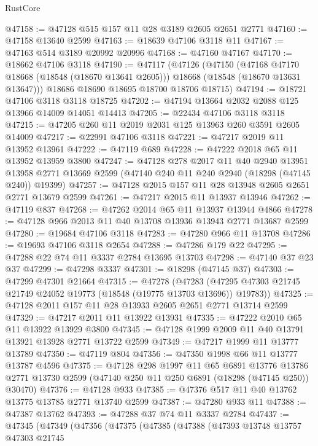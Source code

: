 \begin{lexlean}{RustCore}
\begin{coremodule}
@47158 := @47128 @515 @157 @11 @28 @3189 @2605 @2651 @2771
@47160 := @47158 @13640 @2599
@47163 := @18639 @47106 @3118 @11
@47167 := @47163 @514 @3189 @20992 @20996
@47168 := @47160 @47167
@47170 := @18662 @47106 @3118
@47190 := @47117
    (@47126
      (@47150
        (@47168 @47170 @18668 (@18548 (@18670 @13641 @2605)))
        @18668
        (@18548 (@18670 @13631 @13647)))
      @18686
      @18690
      @18695
      @18700
      @18706
      @18715)
@47194 := @18721 @47106 @3118 @3118 @18725
@47202 := @47194 @13664 @2032 @2088 @125 @13966 @14009 @14051 @14413
@47205 := @22434 @47106 @3118 @3118
@47215 := @47205 @260 @11 @2019 @2031 @125 @13963 @260 @3591 @2605 @14009
@47217 := @22991 @47106 @3118
@47221 := @47217 @2019 @11 @13952 @13961
@47222 := @47119 @689
@47228 := @47222 @2018 @65 @11 @13952 @13959 @3800
@47247 := @47128
    @278
    @2017
    @11
    @40
    @2940
    @13951
    @13958
    @2771
    @13669
    @2599
    (@47140 @240 @11 @240 @2940 (@18298 (@47145 @240)) @19399)
@47257 := @47128 @2015 @157 @11 @28 @13948 @2605 @2651 @2771 @13679 @2599
@47261 := @47217 @2015 @11 @13937 @13946
@47262 := @47119 @837
@47268 := @47262 @2014 @65 @11 @13937 @13944 @4866
@47278 := @47128 @966 @2013 @11 @40 @13708 @13936 @13943 @2771 @13687 @2599
@47280 := @19684 @47106 @3118
@47283 := @47280 @966 @11 @13708
@47286 := @19693 @47106 @3118 @2654
@47288 := @47286 @179 @22
@47295 := @47288 @22 @74 @11 @3337 @2784 @13695 @13703
@47298 := @47140 @37 @23 @37
@47299 := @47298 @3337
@47301 := @18298 (@47145 @37)
@47303 := @47299 @47301 @21664
@47315 := @47278
    (@47283 (@47295 @47303 @21745 @21749 @24052 @19773 (@18548 (@19775 @13703 @13696)) @19783))
@47325 := @47128 @2011 @157 @11 @28 @13933 @2605 @2651 @2771 @13714 @2599
@47329 := @47217 @2011 @11 @13922 @13931
@47335 := @47222 @2010 @65 @11 @13922 @13929 @3800
@47345 := @47128 @1999 @2009 @11 @40 @13791 @13921 @13928 @2771 @13722 @2599
@47349 := @47217 @1999 @11 @13777 @13789
@47350 := @47119 @804
@47356 := @47350 @1998 @66 @11 @13777 @13787 @4596
@47375 := @47128
    @298
    @1997
    @11
    @65
    @6891
    @13776
    @13786
    @2771
    @13730
    @2599
    (@47140 @250 @11 @250 @6891 (@18298 (@47145 @250)) @30470)
@47376 := @47128 @933
@47385 := @47376 @517 @11 @40 @13762 @13775 @13785 @2771 @13740 @2599
@47387 := @47280 @933 @11
@47388 := @47387 @13762
@47393 := @47288 @37 @74 @11 @3337 @2784
@47437 := @47345
    (@47349
      (@47356
        (@47375
          (@47385
            (@47388
              (@47393
                @13748
                @13757
                @47303
                @21745

\end{coremodule}
\end{lexlean}
